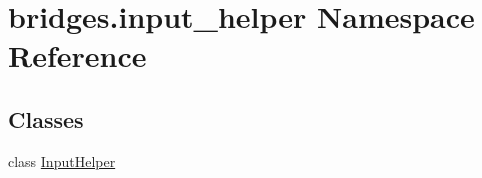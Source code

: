 \hypertarget{namespacebridges_1_1input__helper}{}\section{bridges.\+input\+\_\+helper Namespace Reference}
\label{namespacebridges_1_1input__helper}
\subsection*{Classes}
\begin{DoxyCompactItemize}
\item 
class \mbox{\hyperlink{classbridges_1_1input__helper_1_1_input_helper}{Input\+Helper}}
\end{DoxyCompactItemize}
